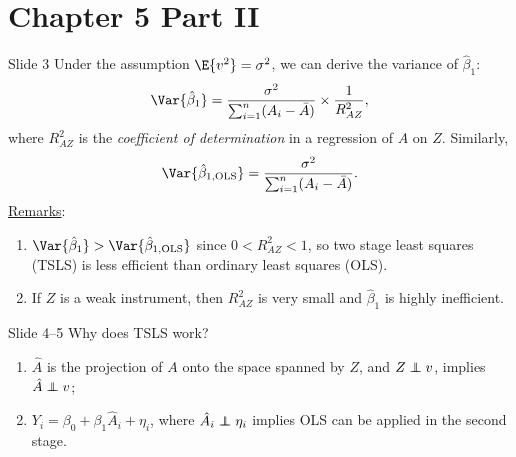 \section*{Chapter 5 Part II}
\begin{Regular}{Slide 3}
    Under the assumption $ \E{v^2}=\sigma^2 $, we can derive the variance of $ \hat{\beta}_1 $:
    \[ \Var{\hat{\beta}_1}=\frac{\sigma^2}{\sum_{i=1}^{n}(A_i-\bar{A})}\times\frac{1}{R^2_{AZ}}, \]
    where $ R^2_{AZ} $ is the \emph{coefficient of determination} in a regression of $ A $ on $ Z $. Similarly,
    \[ \Var{\hat{\beta}_{1,\OLS}}=\frac{\sigma^2}{\sum_{i=1}^{n}(A_i-\bar{A})}. \]
    \tcblower{}
    \underline{Remarks}:
    \begin{enumerate}[(1)]
        \item $ \Var{\hat{\beta}_1}>\Var{\hat{\beta}_{1,\OLS}} $ since $ 0<R^2_{AZ}<1 $, so two stage least squares (TSLS)
              is less efficient than ordinary least squares (OLS).
        \item If $ Z $ is a weak instrument, then $ R^2_{AZ} $ is very small and $ \hat{\beta}_1 $ is highly inefficient.
    \end{enumerate}
\end{Regular}
\begin{Regular}{Slide 4--5}
    Why does TSLS work?
    \begin{enumerate}[(1)]
        \item $ \hat{A} $ is the projection of $ A $ onto the space spanned by $ Z $, and $ Z\indep v $,
              implies $ \hat{A}\indep v $;
        \item $ Y_i=\beta_0+\beta_1\hat{A}_i+\eta_i $, where $ \hat{A}_i\indep \eta_i $ implies OLS can be applied in the second stage.
    \end{enumerate}
\end{Regular}
